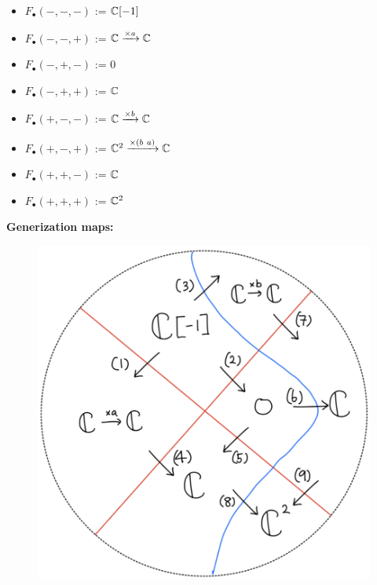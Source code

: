 \begin{itemize}
\item $F_\bullet(-,-,-)$ := $\mathbb{C}[-1]$
\item $F_\bullet(-,-,+)$ := $\mathbb{C} \xrightarrow{\times a} \mathbb{C} $
\item $F_\bullet(-,+,-)$ := $0$
\item $F_\bullet(-,+,+)$ := $\mathbb{C}$
\item $F_\bullet(+,-,-)$ := $\mathbb{C} \xrightarrow{\times b} \mathbb{C} $
\item $F_\bullet(+,-,+)$ := $\mathbb{C}^2 \xrightarrow{\times (b ~ a)} \mathbb{C} $
\item $F_\bullet(+,+,-)$ := $\mathbb{C}$
\item $F_\bullet(+,+,+)$ := $\mathbb{C}^2$
\end{itemize}

\textbf{Generization maps:}
\begin{figure}[H]
    \centering
    \includegraphics[scale = 0.95]{diagrams/lemma4/28.png}
    \caption{}
    \label{fig:your-label}
\end{figure}
